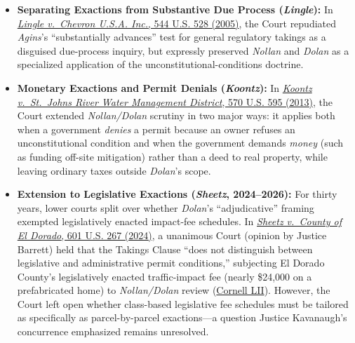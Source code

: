 \documentclass[12pt]{article}
\begin{document}
\begin{itemize}
  \item \textbf{Separating Exactions from Substantive Due Process (\emph{Lingle}):} In \href{https://supreme.justia.com/cases/federal/us/544/528/}{\emph{Lingle v.\ Chevron U.S.A. Inc.}, 544 U.S. 528 (2005)}, the Court repudiated \emph{Agins}'s ``substantially advances'' test for general regulatory takings as a disguised due-process inquiry, but expressly preserved \emph{Nollan} and \emph{Dolan} as a specialized application of the unconstitutional-conditions doctrine.
  \item \textbf{Monetary Exactions and Permit Denials (\emph{Koontz}):} In \href{https://supreme.justia.com/cases/federal/us/570/595/}{\emph{Koontz v.\ St.\ Johns River Water Management District}, 570 U.S. 595 (2013)}, the Court extended \emph{Nollan/Dolan} scrutiny in two major ways: it applies both when a government \emph{denies} a permit because an owner refuses an unconstitutional condition and when the government demands \emph{money} (such as funding off-site mitigation) rather than a deed to real property, while leaving ordinary taxes outside \emph{Dolan}'s scope.

\item \textbf{Extension to Legislative Exactions (\emph{Sheetz}, 2024--2026):} For thirty years, lower courts split over whether \emph{Dolan}'s ``adjudicative'' framing exempted legislatively enacted impact-fee schedules. In \href{https://supreme.justia.com/cases/federal/us/601/22-1074/}{\emph{Sheetz v.\ County of El Dorado}, 601 U.S. 267 (2024)}, a unanimous Court (opinion by Justice Barrett) held that the Takings Clause ``does not distinguish between legislative and administrative permit conditions,'' subjecting El Dorado County's legislatively enacted traffic-impact fee (nearly \$24,000 on a prefabricated home) to \emph{Nollan/Dolan} review (\href{https://www.law.cornell.edu/supremecourt/text/22-1074}{Cornell LII}). However, the Court left open whether class-based legislative fee schedules must be tailored as specifically as parcel-by-parcel exactions---a question Justice Kavanaugh's concurrence emphasized remains unresolved.

\end{itemize}
\end{document}
